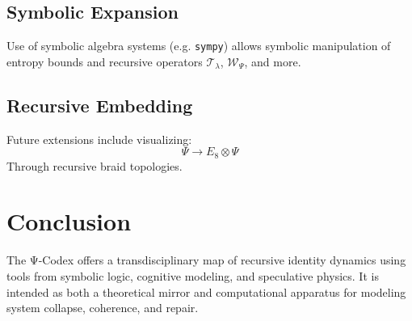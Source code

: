 \documentclass[11pt]{article}
\begin{document}
\subsection{Symbolic Expansion}
Use of symbolic algebra systems (e.g. \texttt{sympy}) allows symbolic manipulation of entropy bounds and recursive operators \( \mathcal{T}_\lambda \), \( \mathcal{W}_\Psi \), and more.

\subsection{Recursive Embedding}
Future extensions include visualizing:
\[
\Psi \to E_8 \otimes \Psi
\]
Through recursive braid topologies.

\section{Conclusion}
The Ψ-Codex offers a transdisciplinary map of recursive identity dynamics using tools from symbolic logic, cognitive modeling, and speculative physics. It is intended as both a theoretical mirror and computational apparatus for modeling system collapse, coherence, and repair.
\end{document}
